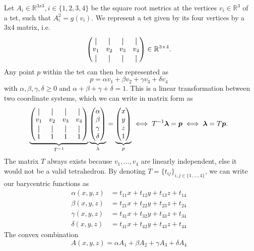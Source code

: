 \documentclass[../thesis.tex]{subfiles}
\begin{document}
Let $A_i \in \mathbb{R}^{3x3}, i \in \{1,2,3,4\}$ be the square root metrics at the vertices $v_i \in \mathbb{R}^3$ of a tet, such that
$A^2_i = g(v_i)$. We represent a tet given by its four vertices by a 3x4 matrix, i.e.
$$\begin{pmatrix}
  \vertbar & \vertbar & \vertbar & \vertbar \\
  v_1 & v_2 & v_3 & v_4 \\
  \vertbar & \vertbar & \vertbar & \vertbar
\end{pmatrix} \in \mathbb{R}^{3\times 4}.$$
Any point $p$ within the tet can then be represented as
$$p = \alpha v_1 + \beta v_2 + \gamma v_3 + \delta v_4$$
with $\alpha, \beta, \gamma, \delta \ge 0$ and $\alpha + \beta + \gamma + \delta = 1$.
This is a linear transformation between two coordinate systems, which we can write in matrix form as
$$\underbrace{\begin{pmatrix}
  \vertbar & \vertbar & \vertbar & \vertbar \\
  v_1 & v_2 & v_3 & v_4 \\
  \vertbar & \vertbar & \vertbar & \vertbar \\
  1 & 1 & 1 & 1
\end{pmatrix}}_{T^{-1}}
\underbrace{
\begin{pmatrix}
  \alpha \\ \beta \\ \gamma \\ \delta
\end{pmatrix}}_{\lambda} = \underbrace{\begin{pmatrix}
  x \\ y \\ z \\ 1 
\end{pmatrix}}_{p}
\iff
T^{-1}\bm{\lambda} = \bm{p} \iff  \bm{\lambda} = T\bm{p}.
$$
The matrix $T$ always exists because $v_1, \dots , v_4$ are linearly independent,
else it would not be a valid tetrahedron.
By denoting $T= \{ t_{ij} \}_{i,j \in \{ 1,\dots, 4\} }$, we can write our barycentric functions as
\begin{align*}
\alpha(x,y,z) &= t_{11}x + t_{12}y + t_{13}z + t_{14} \\
\beta(x,y,z) &= t_{21}x + t_{22}y + t_{23}z + t_{24} \\
\gamma(x,y,z) &= t_{31}x + t_{32}y + t_{33}z + t_{34} \\
\delta(x,y,z) &= t_{41}x + t_{42}y + t_{43}z + t_{44}
\end{align*}
The convex combination
$$A(x,y,z) = \alpha A_1 + \beta A_2 + \gamma A_3 + \delta A_4$$
\end{document}
